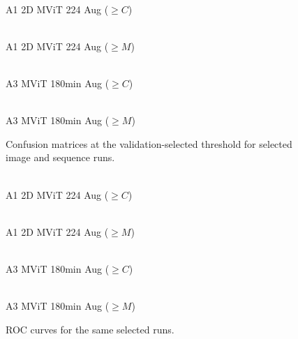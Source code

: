 \begin{figure}[!htbp]
\centering
\begin{minipage}{0.48\textwidth}
\centering
{}
\\[-1mm]\scriptsize A1 2D MViT 224 Aug ($\geq C$)
\end{minipage}\hfill
\begin{minipage}{0.48\textwidth}
\centering
{}
\\[-1mm]\scriptsize A1 2D MViT 224 Aug ($\geq M$)
\end{minipage}
\vspace{2mm}
\begin{minipage}{0.48\textwidth}
\centering
{}
\\[-1mm]\scriptsize A3 MViT 180min Aug ($\geq C$)
\end{minipage}\hfill
\begin{minipage}{0.48\textwidth}
\centering
{}
\\[-1mm]\scriptsize A3 MViT 180min Aug ($\geq M$)
\end{minipage}
\caption{Confusion matrices at the validation-selected threshold for selected image and sequence runs.}
\label{fig:appendix_cm_grid}
\end{figure}

\begin{figure}[!htbp]
\centering
\begin{minipage}{0.48\textwidth}
\centering
{}
\\[-1mm]\scriptsize A1 2D MViT 224 Aug ($\geq C$)
\end{minipage}\hfill
\begin{minipage}{0.48\textwidth}
\centering
{}
\\[-1mm]\scriptsize A1 2D MViT 224 Aug ($\geq M$)
\end{minipage}
\vspace{2mm}
\begin{minipage}{0.48\textwidth}
\centering
{}
\\[-1mm]\scriptsize A3 MViT 180min Aug ($\geq C$)
\end{minipage}\hfill
\begin{minipage}{0.48\textwidth}
\centering
{}
\\[-1mm]\scriptsize A3 MViT 180min Aug ($\geq M$)
\end{minipage}
\caption{ROC curves for the same selected runs.}
\label{fig:appendix_roc_grid}
\end{figure}


